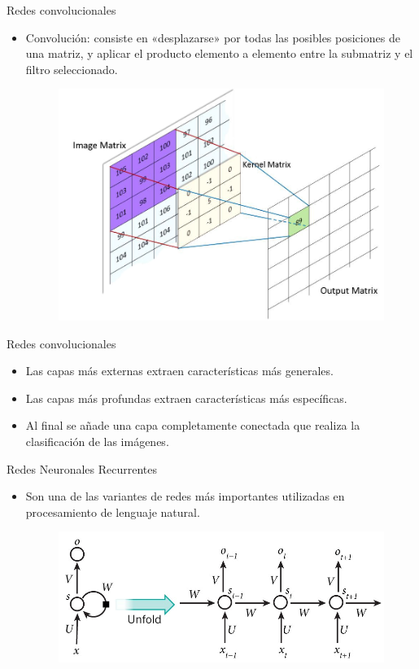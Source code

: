 \documentclass[spanish]{beamer}
\begin{document}
\begin{frame}{Redes convolucionales}
  \begin{itemize}
    \item Convolución: consiste en «desplazarse» por todas las posibles posiciones de una matriz, y aplicar el producto elemento a elemento entre la submatriz y el filtro seleccionado.

    \begin{figure}[h]
      \centering
      \includegraphics[width=.6\textwidth]{img/conv}
    \end{figure}
  \end{itemize}
\end{frame}

\begin{frame}{Redes convolucionales}
    \begin{itemize}
        \item Las capas más externas extraen características más generales.
        \item Las capas más profundas extraen características más específicas.
        \item Al final se añade una capa completamente conectada que realiza la clasificación de las imágenes.
    \end{itemize}
\end{frame}

\begin{frame}{Redes Neuronales Recurrentes}
\begin{itemize}
\item Son una de las variantes de redes más importantes utilizadas en procesamiento
de lenguaje natural.
\begin{figure}[h]
  \centering
  \includegraphics[width=.6\textwidth]{img/rnn}
\end{figure}
\end{itemize}
\end{frame}
\end{document}
